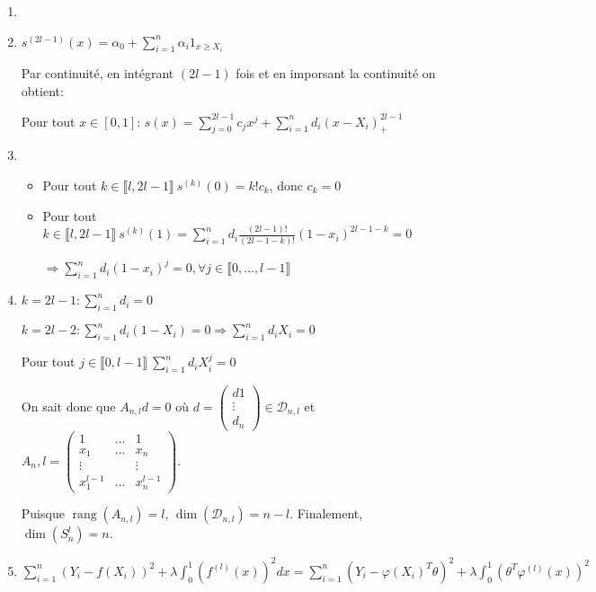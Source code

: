 \documentclass[10pt,a4paper,oneside]{article}
\DeclareMathOperator{\rang}{rang}
\begin{document}
\begin{enumerate}
\item

\item
$s^{(2l - 1)}(x) = \alpha_0 + \sum_{i = 1}^n \alpha_i 1_{x \geq X_i}$

Par continuité, en intégrant $(2l - 1)$ fois et en imporsant la continuité on obtient:

Pour tout $x \in [0,1]$: $s(x) = \sum_{j = 0}^{2l - 1} c_j x^j + \sum_{i = 1}^n d_i (x - X_i)^{2l-1}_+$

\item
\begin{itemize}
\item
Pour tout $k \in \llbracket l,2l - 1 \rrbracket\ s^{(k)}(0) = k! c_k$, donc $\boxed{c_k = 0}$
\item
Pour tout $k \in \llbracket l,2l - 1 \rrbracket\ s^{(k)}(1) = \sum_{i = 1}^n d_i \frac{(2l - 1)!}{(2l - 1 - k)!} (1 - x_i)^{2l - 1 - k} = 0$

$\Rightarrow \boxed{ \sum_{i = 1}^n d_i (1 - x_i)^j = 0 }, \forall j \in \llbracket 0,\ldots,l - 1 \rrbracket$
\end{itemize}

\item
$k = 2l - 1: \sum_{i = 1}^n d_i = 0$

$k = 2l - 2: \sum_{i = 1}^n d_i (1 - X_i) = 0 \Rightarrow \sum_{i = 1}^n d_i X_i = 0$

Pour tout $j \in \llbracket 0,l - 1 \rrbracket\ \sum_{i = 1}^n d_i X_i^j = 0$

On sait donc que $A_{n,l} d = 0$ où $d = \left( \begin{array}{c}
d1 \\ \vdots \\ d_n
\end{array} \right) \in \mathcal{D}_{n,l}$ et $A_n,l = \left( \begin{array}{ccc} 1 & \ldots & 1 \\ x_1 & \ldots & x_n \\ \vdots & & \vdots \\ x_1^{l - 1} & \ldots & x_n^{l - 1}
\end{array} \right)$.

Puisque $\rang(A_{n,l}) = l$, $\dim(\mathcal{D}_{n,l}) = n - l$. Finalement, $\boxed{ \dim(S_n^l) = n }$.

\item
$\sum_{i = 1}^n (Y_i - f(X_i))^2 + \lambda \int_0^1 (f^{(l)}(x))^2 dx = \sum_{i = 1}^n (Y_i - \varphi(X_i)^T \theta)^2 + \lambda \int_0^1 (\theta^T \varphi^{(l)}(x))^2$


\end{enumerate}
\end{document}
